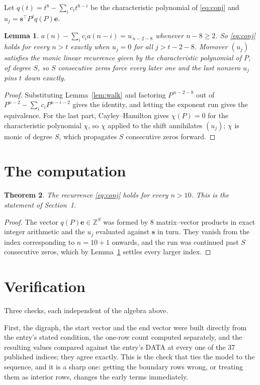 \documentclass[11pt,a4paper]{article}
\theoremstyle{plain}
\newtheorem{theorem}{Theorem}
\newtheorem{lemma}[theorem]{Lemma}
\theoremstyle{definition}
\begin{document}
Let $q(t)=t^{8}-\sum_i c_i t^{8-i}$ be the characteristic polynomial of
\eqref{eq:conj} and $u_j=\mathbf{s}^{\!\top}P^{j}q(P)\mathbf{e}$.

\begin{lemma}\label{lem:crit}
$a(n)-\sum_i c_i a(n-i)=u_{\,n-2-8}$ whenever $n-8\ge2$. So \eqref{eq:conj}
holds for every $n>t$ exactly when $u_j=0$ for all $j>t-2-8$. Moreover $(u_j)$
satisfies the monic linear recurrence given by the characteristic polynomial of $P$, of
degree $S$, so $S$ consecutive zeros force every later one and the last nonzero $u_j$ pins
$t$ down exactly.
\end{lemma}

\begin{proof}
Substituting Lemma~\ref{lem:walk} and factoring $P^{\,n-2-8}$ out of
$P^{n-2}-\sum_i c_i P^{n-i-2}$ gives the identity, and letting the exponent run gives the
equivalence. For the last part, Cayley--Hamilton gives $\chi(P)=0$ for the characteristic
polynomial $\chi$, so $\chi$ applied to the shift annihilates $(u_j)$; $\chi$ is monic of
degree $S$, which propagates $S$ consecutive zeros forward.
\end{proof}

\section{The computation}

\begin{theorem}
The recurrence \eqref{eq:conj} holds for every $n>10$. This is the statement of
Section~1.
\end{theorem}

\begin{proof}
The vector $q(P)\mathbf{e}\in\mathbb{Z}^{S}$ was formed by $8$ matrix--vector
products in exact integer arithmetic and the $u_j$ evaluated against $\mathbf{s}$ in turn.
They vanish from the index corresponding to $n=10+1$ onwards, and the run was continued
past $S$ consecutive zeros, which by Lemma~\ref{lem:crit} settles every larger index.
\end{proof}

\section{Verification}

Three checks, each independent of the algebra above.

First, the digraph, the start vector and the end vector were built directly from the
entry's stated condition, the one-row count computed separately, and the resulting values
compared against the entry's DATA at every one of the $37$ published indices; they
agree exactly. This is the check that ties the model to the sequence, and it is a sharp one:
getting the boundary rows wrong, or treating them as interior rows, changes the early terms
immediately.
\end{document}
